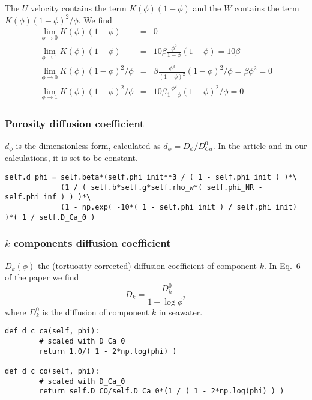 \documentclass[a4paper]{article}
\newcommand{\nn}{\nonumber}
\begin{document}
The $U$ velocity contains the term $K(\phi)(1-\phi)$
and the $W$ contains the term $K(\phi)(1-\phi)^2/\phi$.
We find
\begin{eqnarray}
\lim_{\phi\rightarrow 0} K(\phi)(1-\phi) &=& 0 \nn\\
\lim_{\phi\rightarrow 1} K(\phi)(1-\phi) &=& 10 \beta \frac{\phi^2}{1-\phi}(1-\phi) = 10 \beta\nn\\
\lim_{\phi\rightarrow 0} K(\phi)(1-\phi)^2/\phi 
&=& \beta  \frac{\phi^3}{(1-\phi)^2} (1-\phi)^2/\phi = \beta \phi^2 = 0 \nn\\
\lim_{\phi\rightarrow 1} K(\phi)(1-\phi)^2/\phi &=& 10 \beta \frac{\phi^2}{1-\phi} (1-\phi)^2/\phi = 0 \nn
\end{eqnarray}

\subsubsection*{Porosity diffusion coefficient}

$d_\phi$ is the dimensionless form, calculated as $d_\phi=D_\phi/D^0_{Ca}$.
In the article and in our calculations, it is set to be constant.

\begin{lstlisting}
self.d_phi = self.beta*(self.phi_init**3 / ( 1 - self.phi_init ) )*\ 
             (1 / ( self.b*self.g*self.rho_w*( self.phi_NR - self.phi_inf ) ) )*\ 
             (1 - np.exp( -10*( 1 - self.phi_init ) / self.phi_init) )*( 1 / self.D_Ca_0 )
\end{lstlisting}

\subsubsection*{$k$ components diffusion coefficient}

$D_k(\phi)$ the (tortuosity-corrected) diffusion
coefficient of component $k$.
In Eq.~6 of the paper we find 
\[
D_k = \frac{D_k^0}{1- \log \phi^2}
\]
where $D_k^0$ is the diffusion of component $k$ in seawater.

\begin{lstlisting}
def d_c_ca(self, phi):
        # scaled with D_Ca_0
        return 1.0/( 1 - 2*np.log(phi) )

def d_c_co(self, phi):
        # scaled with D_Ca_0
        return self.D_CO/self.D_Ca_0*(1 / ( 1 - 2*np.log(phi) ) )
\end{lstlisting}
\end{document}
